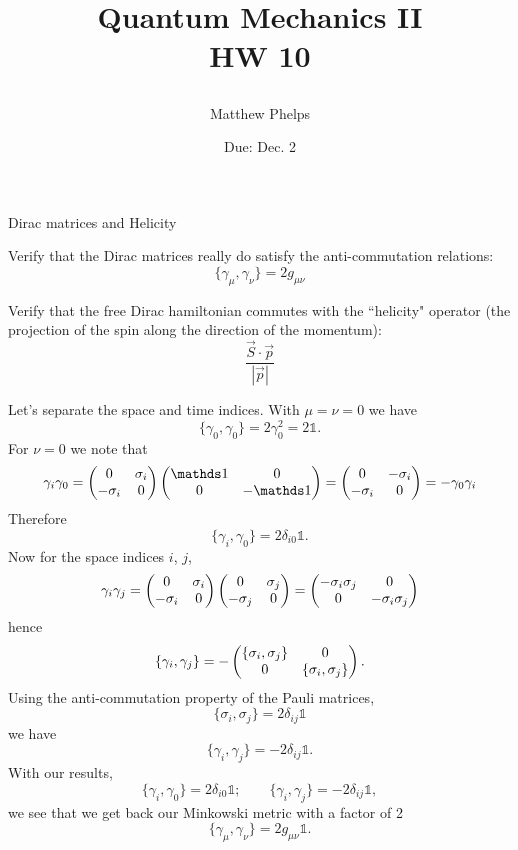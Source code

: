 \documentclass[10pt,letterpaper]{article}
\title{\begin{spacing}{1.2}Quantum Mechanics II\\HW 10\end{spacing}}
\author{Matthew Phelps}
\date{Due: Dec. 2 }
\begin{document}
\maketitle

\benum
  	 \item{Dirac matrices and Helicity}

	\benum
	\item
	Verify that the Dirac matrices really do satisfy the anti-commutation relations:
	\[
		\{ \gamma_\mu,\gamma_\nu \} = 2g_{\mu\nu}
	\]
	\item
	Verify that the free Dirac hamiltonian commutes with the ``helicity" operator (the projection of the spin
	along the direction of the momentum):
	\[
		\frac{\vec S\cdot\vec p}{|\vec p|}
	\]			
	\eenum
	
	\benum
	\item
	Let's separate the space and time indices. With $\mu = \nu = 0$ we have
	\[
		\{ \gamma_0,\gamma_0 \} = 2\gamma_0^2 = 2\mathds 1.
	\]
	For $\nu = 0$ we note that
	\[
		\gamma_i \gamma_0 = \bpm 0 & \sigma_i \\ -\sigma_i & 0 \epm
		 \bpm \mathds 1 & 0 \\ 0 & -\mathds 1\epm  = \bpm 0&-\sigma_i\\ -\sigma_i &0\epm
		 = -\gamma_0\gamma_i
	\]
	Therefore
	\[
		\{ \gamma_i,\gamma_0 \} = 2\delta_{i 0} \mathds 1.
	\]
	Now for the space indices $i$, $j$,
	\[
		\gamma_i\gamma_j = 
		\begin{pmatrix} 0 & \sigma_i \\ -\sigma_i & 0 \end{pmatrix}
		\begin{pmatrix} 0 & \sigma_j \\ -\sigma_j & 0 \end{pmatrix}
		= \begin{pmatrix} -\sigma_i\sigma_j & 0\\ 0 & -\sigma_i\sigma_j \end{pmatrix}
	\]
	hence
	\[
		\{ \gamma_i,\gamma_j \} =- \begin{pmatrix} \{ \sigma_i,\sigma_j\} & 0 \\ 0& \{\sigma_i,\sigma_j\}  \end{pmatrix}.
	\]
	Using the anti-commutation property of the Pauli matrices,
	\[
		\{ \sigma_i,\sigma_j \} = 2\delta_{ij}\mathds 1
	\]
	we have
	\[
		\{ \gamma_i,\gamma_j \} =
		-2 \delta_{ij}\mathds 1.
	\]
	With our results,
	\[
		\{ \gamma_i,\gamma_0 \} = 2\delta_{i 0} \mathds 1;\qquad 
		\{ \gamma_i,\gamma_j \} = -2\delta_{i j} \mathds 1,
	\]
	we see that we get back our Minkowski metric with a factor of 2
	\[
		\{ \gamma_\mu,\gamma_\nu \} = 2g_{\mu\nu}\mathds 1.
	\]
	\\
	
\end{document}
